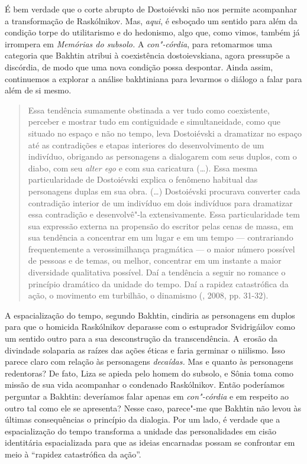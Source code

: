 É bem verdade que o corte abrupto de Dostoiévski não nos permite
acompanhar a transformação de Raskólnikov. Mas, \emph{aqui}, é esboçado
um sentido para além da condição torpe do utilitarismo e do hedonismo,
algo que, como vimos, também já irrompera em \emph{Memórias do subsolo.}
A \emph{con"-córdia}, para retomarmos uma categoria que Bakhtin atribui à
coexistência dostoievskiana, agora pressupõe a discórdia, de modo que
uma nova condição possa despontar. Ainda assim, continuemos a explorar a
análise bakhtiniana para levarmos o diálogo a falar para além de si
mesmo.

\begin{quote}
Essa tendência sumamente obstinada a ver tudo como coexistente, perceber
e mostrar tudo em contiguidade e simultaneidade, como que situado no
espaço e não no tempo, leva Dostoiévski a dramatizar no espaço até as
contradições e etapas interiores do desenvolvimento de um indivíduo,
obrigando as personagens a dialogarem com seus duplos, com o diabo, com
seu \emph{alter ego} e com sua caricatura (\ldots). Essa mesma
particularidade de Dostoiévski explica o fenômeno habitual das
personagens duplas em sua obra. (\ldots) Dostoiévski procurava converter
cada contradição interior de um indivíduo em dois indivíduos para
dramatizar essa contradição e desenvolvê"-la extensivamente. Essa
particularidade tem sua expressão externa na propensão do escritor pelas
cenas de massa, em sua tendência a concentrar em um lugar e em um tempo
--- contrariando frequentemente a verossimilhança pragmática --- o maior
número possível de pessoas e de temas, ou melhor, concentrar em um
instante a maior diversidade qualitativa possível. Daí a tendência a
seguir no romance o princípio dramático da unidade do tempo. Daí a
rapidez catastrófica da ação, o movimento em turbilhão, o dinamismo
(, 2008, pp. 31-32).
\end{quote}

A espacialização do tempo, segundo Bakhtin, cindiria as personagens em
duplos para que o homicida Raskólnikov deparasse com o estuprador
Svidrigáilov como um sentido outro para a sua desconstrução da
transcendência. A~erosão da divindade solaparia as raízes das ações
éticas e faria germinar o niilismo. Isso parece claro com relação às
personagens \emph{decaídas.} Mas e quanto às personagens redentoras? De
fato, Liza se apieda pelo homem do subsolo, e Sônia toma como missão de
sua vida acompanhar o condenado Raskólnikov. Então poderíamos perguntar
a Bakhtin: deveríamos falar apenas em \emph{con"-córdia} e em respeito ao
outro tal como ele se apresenta? Nesse caso, parece"-me que Bakhtin não
levou às últimas consequências o princípio da dialogia. Por um lado, é
verdade que a espacialização do tempo transforma a unidade das
personalidades em cisão identitária espacializada para que as ideias
encarnadas possam se confrontar em meio à ``rapidez catastrófica da
ação''.

